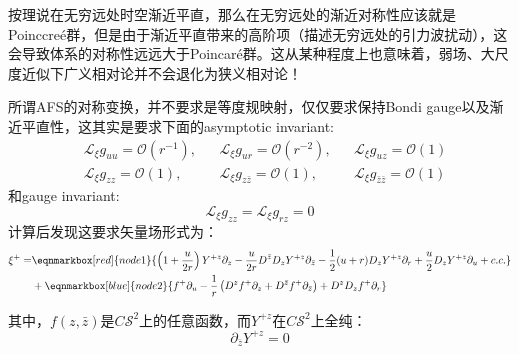 按理说在无穷远处时空渐近平直，那么在无穷远处的渐近对称性应该就是Poinccre\'e群，但是由于渐近平直带来的高阶项（描述无穷远处的引力波扰动），这会导致体系的对称性远远大于Poincar\'e群。这从某种程度上也意味着，弱场、大尺度近似下广义相对论并不会退化为狭义相对论！

所谓AFS的对称变换，并不要求是等度规映射，仅仅要求保持Bondi gauge以及渐近平直性，这其实是要求下面的asymptotic invariant:
\begin{align*}
	&\mathcal{L}_\xi g_{uu}=\mathcal{O}(r^{-1}),&&\mathcal{L}_\xi g_{ur}=\mathcal{O}(r^{-2}),&&\mathcal{L}_\xi g_{uz}=\mathcal{O}(1)\\
	&\mathcal{L}_\xi g_{zz}=\mathcal{O}(1),&&\mathcal{L}_\xi g_{z\bar z}=\mathcal{O}(1),&&\mathcal{L}_\xi g_{\bar z \bar z}=\mathcal{O}(1)
\end{align*}
和gauge invariant:
\begin{equation}
	\mathcal{L}_\xi g_{zz}=\mathcal{L}_\xi g_{rz}=0
\end{equation}
计算后发现这要求矢量场形式为：
\begin{equation}
	\begin{aligned}
		\xi^+=&\eqnmarkbox[red]{node1}{\left(1+\frac{u}{2r}\right)Y^{+z}\partial_z-\frac{u}{2r}D^{\bar z}D_zY^{+z}\partial_{\bar z}-\frac{1}{2}(u+r)D_zY^{+z}\partial_r+\frac{u}{2}D_zY^{+z}\partial_u+c.c.}\\
		&+\eqnmarkbox[blue]{node2}{f^+\partial_u-\frac{1}{r}\left(D^zf^+\partial_z+D^{\bar z}f^+\partial_{\bar z}\right)+D^zD_zf^+\partial_r}
	\end{aligned}
\end{equation}

\noindent 其中，$f(z,\bar z)$是$C\mathcal{S}^2$上的任意函数，而$Y^{+z}$在$C\mathcal{S}^2$上全纯：
\begin{equation}\label{Y}
	\partial_{\bar z}Y^{+z}=0
\end{equation}

